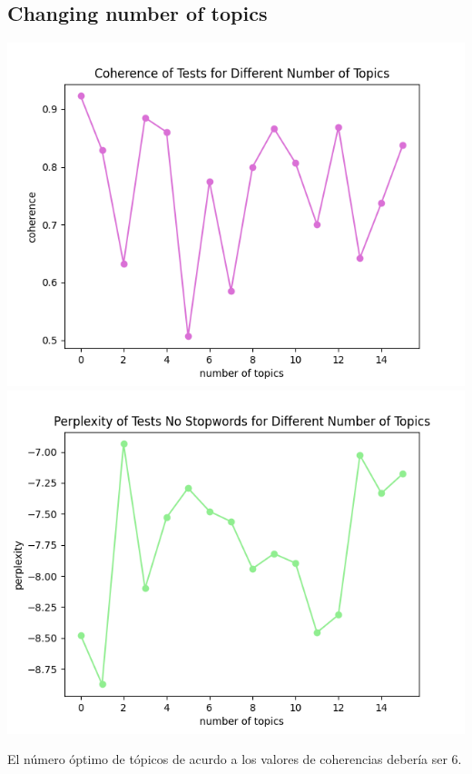 \documentclass[10pt]{article} %
\begin{document}
	\subsection{Changing number of topics}
	\begin{center}
		\includegraphics[scale=0.6]{images/coherence_no_stopwords_diff_n_topics}
		\includegraphics[scale=0.6]{images/perplexity_no_stopwords_diff_n_topics}
	\end{center}

	El n\'umero \'optimo de t\'opicos de acurdo a los valores de coherencias deber\'ia ser 6.
	
	
	
\end{document}

